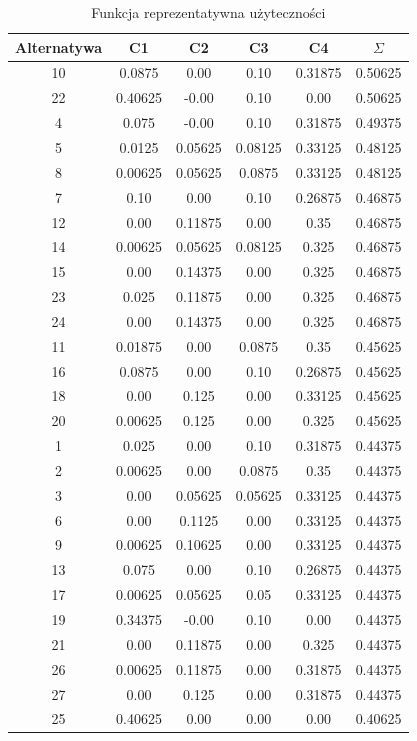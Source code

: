 \documentclass[11pt]{article}
\begin{document}
\begin{table}[H]
    \centering
    \begin{tabular}{|c|c|c|c|c|c|}
        \hline
        Alternatywa & C1  & C2  & C3  & C4  & $\Sigma$ \\
        \hline
        10 & 0.0875 & 0.00 & 0.10 & 0.31875 & 0.50625 \\
        22 & 0.40625 & -0.00 & 0.10 & 0.00 & 0.50625 \\
        4  & 0.075 & -0.00 & 0.10 & 0.31875 & 0.49375 \\
        5  & 0.0125 & 0.05625 & 0.08125 & 0.33125 & 0.48125 \\
        8  & 0.00625 & 0.05625 & 0.0875 & 0.33125 & 0.48125 \\
        7  & 0.10 & 0.00 & 0.10 & 0.26875 & 0.46875 \\
        12 & 0.00 & 0.11875 & 0.00 & 0.35 & 0.46875 \\
        14 & 0.00625 & 0.05625 & 0.08125 & 0.325 & 0.46875 \\
        15 & 0.00 & 0.14375 & 0.00 & 0.325 & 0.46875 \\
        23 & 0.025 & 0.11875 & 0.00 & 0.325 & 0.46875 \\
        24 & 0.00 & 0.14375 & 0.00 & 0.325 & 0.46875 \\
        11 & 0.01875 & 0.00 & 0.0875 & 0.35 & 0.45625 \\
        16 & 0.0875 & 0.00 & 0.10 & 0.26875 & 0.45625 \\
        18 & 0.00 & 0.125 & 0.00 & 0.33125 & 0.45625 \\
        20 & 0.00625 & 0.125 & 0.00 & 0.325 & 0.45625 \\
        1  & 0.025 & 0.00 & 0.10 & 0.31875 & 0.44375 \\
        2  & 0.00625 & 0.00 & 0.0875 & 0.35 & 0.44375 \\
        3  & 0.00 & 0.05625 & 0.05625 & 0.33125 & 0.44375 \\
        6  & 0.00 & 0.1125 & 0.00 & 0.33125 & 0.44375 \\
        9  & 0.00625 & 0.10625 & 0.00 & 0.33125 & 0.44375 \\
        13 & 0.075 & 0.00 & 0.10 & 0.26875 & 0.44375 \\
        17 & 0.00625 & 0.05625 & 0.05 & 0.33125 & 0.44375 \\
        19 & 0.34375 & -0.00 & 0.10 & 0.00 & 0.44375 \\
        21 & 0.00 & 0.11875 & 0.00 & 0.325 & 0.44375 \\
        26 & 0.00625 & 0.11875 & 0.00 & 0.31875 & 0.44375 \\
        27 & 0.00 & 0.125 & 0.00 & 0.31875 & 0.44375 \\
        25 & 0.40625 & 0.00 & 0.00 & 0.00 & 0.40625 \\
        \hline
    \end{tabular}
    \caption{Funkcja reprezentatywna użyteczności}
    \label{tab:representative_utility}
\end{table}
\end{document}
